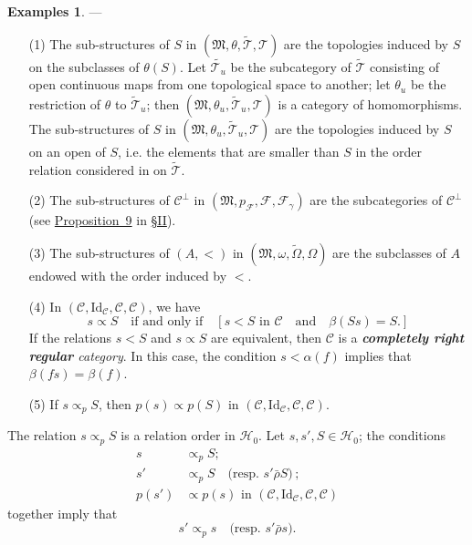 \documentclass[a4paper,fleqn]{article}
\theoremstyle{plain}
\newenvironment{theorem}[1]
  {\renewcommand\theinnertheorem{#1}\innertheorem}
  {\endinnertheorem}
\theoremstyle{definition}
\newtheorem*{examples}{Examples}
\newcommand{\oldpage}[1]{{\marginpar{\footnotesize$\bigg\vert$\,\,\,\,\textit{p.~#1}}}}
\newcommand{\unsure}[1]{{\color{purple}\textbf{#1}}}
\newcommand{\textand}{\quad\text{and}\quad}
\newcommand{\CC}{\mathcal{C}}
\newcommand{\HH}{\mathcal{H}}
\newcommand{\MM}{\mathfrak{M}}
\newcommand{\FF}{\mathcal{F}}
\newcommand{\TT}{\mathcal{T}}
\newcommand{\tTT}{\widetilde{\TT}}
\newcommand{\relrhobar}{\mathrel{\bar{\rho}}}
\newcommand{\subs}{\mathrel{\propto}}
\newcommand{\Id}{\mathrm{Id}}
\begin{document}
\begin{examples}
  ---
  \begin{enumerate}
    \item[\normalfont(1)]
      The sub-structures of $S$ in $(\MM,\theta,\tTT,\TT)$ are the topologies induced by $S$ on the subclasses of $\theta(S)$.
      Let $\widetilde{\TT_u}$ be the subcategory of $\tTT$ consisting of open continuous maps from one topological space to another;
      let $\theta_u$ be the restriction of $\theta$ to $\tTT_u$;
      then $(\MM,\theta_u,\tTT_u,\TT)$ is a category of homomorphisms.
      The sub-structures of $S$ in $(\MM,\theta_u,\tTT_u,\TT)$ are the topologies induced by $S$ on an open of $S$, i.e. the elements that are smaller than $S$ in the order relation considered in \cite{3c} on $\tTT$.
    \item[\normalfont(2)]
      The sub-structures of $\CC^\perp$ in $(\MM,p_\FF,\FF,\FF_\gamma)$ are the subcategories of $\CC^\perp$ (see \hyperref[proposition:i-9]{Proposition~9} in \hyperref[section:ii]{§II}).
    \item[\normalfont(3)]
      The sub-structures of $(A,<)$ in $(\MM,\omega,\widetilde{\Omega},\Omega)$ are the subclasses of $A$ endowed with the order induced by $<$.
    \item[\normalfont(4)]
      In $(\CC,\Id_\CC,\CC,\CC)$, we have
      \[
        s\subs S
        \quad\text{if and only if}\quad
        [
          \text{$s<S$ in $\CC$}
          \textand
          \beta(Ss)=S.
        ]
      \]
      If the relations $s<S$ and $s\subs S$ are equivalent, then $\CC$ is a \emph{\unsure{completely right regular} category}.
      In this case, the condition $s<\alpha(f)$ implies that $\beta(fs)=\beta(f)$.
    \item[\normalfont(5)]
      If $s\subs_p S$, then $p(s)\subs p(S)$ in $(\CC,\Id_\CC,\CC,\CC)$.
  \end{enumerate}
\end{examples}

\begin{theorem}{1}
\label{theorem:i-1}
  \oldpage{362}
  The relation $s\subs_p S$ is a relation order in $\HH_0$.
  Let $s,s',S\in\HH_0$;
  the conditions
  \[
    \begin{aligned}
      s&\subs_p S;
    \\s'&\subs_p S
      \quad\text{(resp. $s'\relrhobar S$)}\,;
    \\p(s')&\subs p(s)\text{ in }(\CC,\Id_\CC,\CC,\CC)
    \end{aligned}
  \]
  together imply that
  \[
    s'\subs_p s
    \quad\text{(resp. $s'\relrhobar s$)}.
  \]
\end{theorem}
\end{document}
